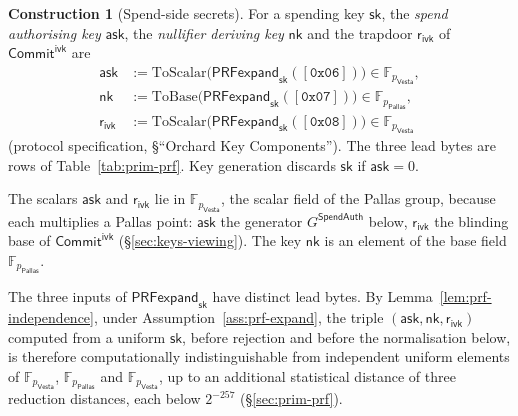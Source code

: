 \documentclass[11pt,a4paper]{article}
\theoremstyle{definition}
\newtheorem{construction}[theorem]{Construction}
\newcommand{\F}{\mathbb{F}}
\newcommand{\Pallas}{\ensuremath{\mathsf{Pallas}}}
\newcommand{\Vesta}{\ensuremath{\mathsf{Vesta}}}
\newcommand{\CommitIvk}{\ensuremath{\mathsf{Commit}^{\mathsf{ivk}}}}
\newcommand{\ask}{\ensuremath{\mathsf{ask}}}
\newcommand{\nksym}{\ensuremath{\mathsf{nk}}}
\newcommand{\rivk}{\ensuremath{\mathsf{r_{ivk}}}}
\begin{document}
\begin{construction}[Spend-side secrets]
For a spending key $\mathsf{sk}$, the \emph{spend authorising key}
$\ask$, the \emph{nullifier deriving key} $\nksym$ and the trapdoor $\rivk$
of $\CommitIvk$ are
\begin{align*}
  \ask &:= \mathrm{ToScalar}\bigl(\mathsf{PRFexpand}_{\mathsf{sk}}
    ([\mathtt{0x06}])\bigr) \in \F_{p_{\Vesta}}, \\
  \nksym &:= \mathrm{ToBase}\bigl(\mathsf{PRFexpand}_{\mathsf{sk}}
    ([\mathtt{0x07}])\bigr) \in \F_{p_{\Pallas}}, \\
  \rivk &:= \mathrm{ToScalar}\bigl(\mathsf{PRFexpand}_{\mathsf{sk}}
    ([\mathtt{0x08}])\bigr) \in \F_{p_{\Vesta}}
\end{align*}
(protocol specification, \S``Orchard Key Components''). The three lead
bytes are rows of Table~\ref{tab:prim-prf}. Key generation discards
$\mathsf{sk}$ if $\ask = 0$.
\end{construction}

The scalars $\ask$ and $\rivk$ lie in $\F_{p_{\Vesta}}$, the scalar field of
the Pallas group, because each multiplies a Pallas point: $\ask$ the
generator $G^{\mathsf{SpendAuth}}$ below, $\rivk$ the blinding base of
$\CommitIvk$ (\S\ref{sec:keys-viewing}). The key $\nksym$ is an element of
the base field $\F_{p_{\Pallas}}$.

The three inputs of $\mathsf{PRFexpand}_{\mathsf{sk}}$ have distinct lead
bytes. By Lemma~\ref{lem:prf-independence}, under
Assumption~\ref{ass:prf-expand}, the triple $(\ask, \nksym, \rivk)$ computed
from a uniform $\mathsf{sk}$, before rejection and before the normalisation
below, is therefore computationally indistinguishable from independent
uniform elements of $\F_{p_{\Vesta}}$, $\F_{p_{\Pallas}}$ and
$\F_{p_{\Vesta}}$, up to an additional statistical distance of three
reduction distances, each below $2^{-257}$ (\S\ref{sec:prim-prf}).
\end{document}
